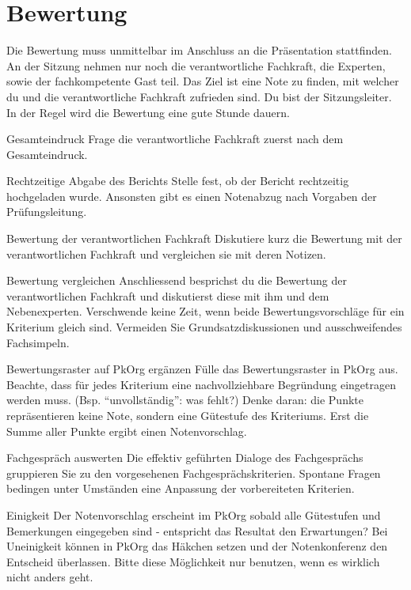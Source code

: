 \section{Bewertung}
Die Bewertung muss unmittelbar im Anschluss an die Präsentation stattfinden. An der Sitzung
nehmen nur noch die verantwortliche Fachkraft, die Experten, sowie der fachkompetente Gast teil. Das Ziel ist eine Note zu finden, mit welcher du und die verantwortliche Fachkraft zufrieden sind. Du bist der Sitzungsleiter. In der Regel wird die Bewertung eine gute Stunde dauern.

\begin{taskitem}{Gesamteindruck}
  Frage die verantwortliche Fachkraft zuerst nach dem Gesamteindruck.
\end{taskitem}
\begin{taskitem}{Rechtzeitige Abgabe des Berichts}
  Stelle fest, ob der Bericht rechtzeitig hochgeladen wurde. Ansonsten gibt es einen Notenabzug nach Vorgaben der Prüfungsleitung.
\end{taskitem}
\begin{taskitem}{Bewertung der verantwortlichen Fachkraft}
  Diskutiere kurz die Bewertung mit der verantwortlichen Fachkraft und vergleichen sie mit deren Notizen.
\end{taskitem}
\begin{taskitem}{Bewertung vergleichen}
  Anschliessend besprichst du die Bewertung der verantwortlichen Fachkraft und diskutierst diese mit ihm und dem Nebenexperten. Verschwende keine Zeit, wenn beide Bewertungsvorschläge für ein Kriterium gleich sind. Vermeiden Sie Grundsatzdiskussionen und ausschweifendes Fachsimpeln.
\end{taskitem}
\begin{taskitem}{Bewertungsraster auf PkOrg ergänzen}
  Fülle das Bewertungsraster in PkOrg aus. Beachte, dass für jedes Kriterium eine nachvollziehbare Begründung eingetragen werden muss. (Bsp. \enquote{unvollständig}: was fehlt?) Denke daran: die Punkte repräsentieren keine Note, sondern eine Gütestufe des Kriteriums. Erst die Summe aller Punkte ergibt einen Notenvorschlag.
\end{taskitem}
\begin{taskitem}{Fachgespräch auswerten}
  Die effektiv geführten Dialoge des Fachgesprächs gruppieren Sie zu den vorgesehenen Fachgesprächskriterien. Spontane Fragen bedingen unter Umständen eine Anpassung der vorbereiteten Kriterien.
\end{taskitem}
\begin{taskitem}{Einigkeit}
  Der Notenvorschlag erscheint im PkOrg sobald alle Gütestufen und Bemerkungen eingegeben sind - entspricht das Resultat den Erwartungen? Bei Uneinigkeit können in PkOrg das Häkchen setzen und der Notenkonferenz den Entscheid überlassen. Bitte diese Möglichkeit nur benutzen, wenn es wirklich nicht anders geht.
\end{taskitem}
